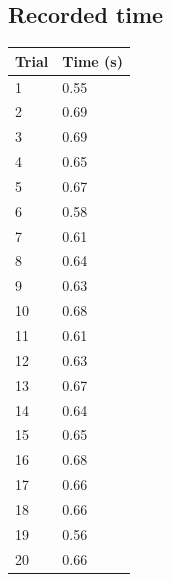 \documentclass[11pt, letterpaper, includehead]{article}
\begin{document}
\subsection{Recorded time} %
\begin{center}
  \begin{tabular}[H]{| m{2cm} | m{2cm} |}
    \hline
    \textbf{Trial} & \textbf{Time (s)} \\
    \hline
    1              & 0.55              \\
    \hline
    2              & 0.69              \\
    \hline
    3              & 0.69              \\
    \hline
    4              & 0.65              \\
    \hline
    5              & 0.67              \\
    \hline
    6              & 0.58              \\
    \hline
    7              & 0.61              \\
    \hline
    8              & 0.64              \\
    \hline
    9              & 0.63              \\
    \hline
    10             & 0.68              \\
    \hline
    11             & 0.61              \\
    \hline
    12             & 0.63              \\
    \hline
    13             & 0.67              \\
    \hline
    14             & 0.64              \\
    \hline
    15             & 0.65              \\
    \hline
    16             & 0.68              \\
    \hline
    17             & 0.66              \\
    \hline
    18             & 0.66              \\
    \hline
    19             & 0.56              \\
    \hline
    20             & 0.66              \\
    \hline
  \end{tabular}
\end{center}
\end{document}
